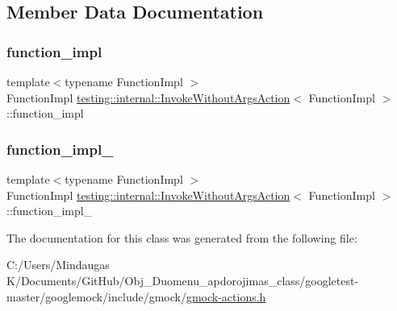 \subsection{Member Data Documentation}
\mbox{\label{structtesting_1_1internal_1_1_invoke_without_args_action_a60320725a70c43f3257264ffc905fd71}} 
\subsubsection{\texorpdfstring{function\_impl}{function\_impl}}
{\footnotesize\ttfamily template$<$typename Function\+Impl $>$ \\
Function\+Impl \mbox{\hyperlink{structtesting_1_1internal_1_1_invoke_without_args_action}{testing\+::internal\+::\+Invoke\+Without\+Args\+Action}}$<$ Function\+Impl $>$\+::function\+\_\+impl}

\mbox{\label{structtesting_1_1internal_1_1_invoke_without_args_action_a29e9e7e089dd4b66fc931c0da54809b1}} 
\subsubsection{\texorpdfstring{function\_impl\_}{function\_impl\_}}
{\footnotesize\ttfamily template$<$typename Function\+Impl $>$ \\
Function\+Impl \mbox{\hyperlink{structtesting_1_1internal_1_1_invoke_without_args_action}{testing\+::internal\+::\+Invoke\+Without\+Args\+Action}}$<$ Function\+Impl $>$\+::function\+\_\+impl\+\_\+\hspace{0.3cm}{\ttfamily [private]}}



The documentation for this class was generated from the following file\+:\begin{DoxyCompactItemize}
\item 
C\+:/\+Users/\+Mindaugas K/\+Documents/\+Git\+Hub/\+Obj\+\_\+\+Duomenu\+\_\+apdorojimas\+\_\+class/googletest-\/master/googlemock/include/gmock/\mbox{\hyperlink{googletest-master_2googlemock_2include_2gmock_2gmock-actions_8h}{gmock-\/actions.\+h}}\end{DoxyCompactItemize}
